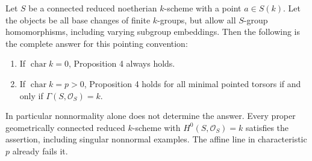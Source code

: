 \begin{theorem}
\label{C:constant-all-maps}
Let $S$ be a connected reduced noetherian $k$-scheme with a point
$a\in S(k)$.  Let the objects be all base changes of finite $k$-groups,
but allow all $S$-group homomorphisms, including varying subgroup
embeddings.  Then the following is the complete answer for this
pointing convention:
\begin{enumerate}
\item If $\operatorname{char}k=0$, Proposition 4 always holds.
\item If $\operatorname{char}k=p>0$, Proposition 4 holds for all
minimal pointed torsors if and only if $\Gamma(S,\mathcal O_S)=k$.
\end{enumerate}
In particular nonnormality alone does not determine the answer.
Every proper geometrically connected reduced $k$-scheme with
$H^0(S,\mathcal O_S)=k$ satisfies the assertion, including singular
nonnormal examples.  The affine line in characteristic $p$ already
fails it.
\end{theorem}

